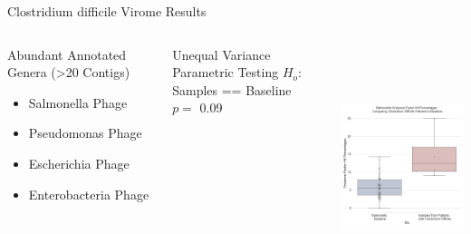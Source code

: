\documentclass[11pt]{beamer}
\begin{document}
  \begin{frame}{Clostridium difficile Virome Results}
  \begin{columns}
	\hspace{2cm}
	\begin{block}{Abundant Annotated Genera (>20 Contigs)}
	\begin{itemize}
	\item \alert{Salmonella Phage}
	\item Pseudomonas Phage
	\item Escherichia Phage
	\item Enterobacteria Phage
  \end{itemize}
  \end{block}
  
  \begin{block}{Unequal Variance \\ Parametric Testing}
  $H_o$: Samples == Baseline \\
  \vspace{0.2cm}
  $p =$ 0.09
  \end{block}
  
	\centering
	\includegraphics[height=7cm, width=6cm]{CDif_Comparison.jpg}
	
	\end{columns}
	
	\end{frame}
	
\section{}
\end{document}
